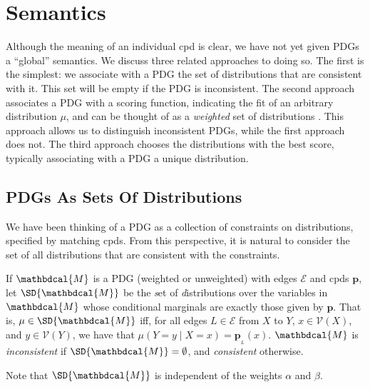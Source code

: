 \documentclass[letterpaper]{article} %
\theoremstyle{plain}
\theoremstyle{definition}
\theoremstyle{remark}
\newcommand\mat[1]{\mathbf{#1}}
\def\sheq{\!=\!}
\newcommand{\bp}[1][L]{\mat{p}_{\!_{#1}\!}}
\newcommand{\V}{\mathcal V}
\newcommand{\Ed}{\mathcal E}
\newcommand{\dg}[1]{\mathbdcal{#1}}
\newcommand{\notation}[1]{\ignorespaces} %
\begin{document}
\section{Semantics}\label{sec:semantics}
Although the meaning of an individual cpd is clear, we have not yet given 
PDGs a ``global'' semantics. We discuss three related approaches to doing so.
The first is the simplest: we associate with a PDG the set of distributions that
are consistent with it. This set will be empty if the PDG is inconsistent.
The second approach associates a PDG with a scoring function, indicating the fit
of an arbitrary distribution $\mu$, and can be thought of as a \emph{weighted}
set of distributions \cite{HL12}. This approach allows us to distinguish
inconsistent PDGs, while the first approach does not. The third approach chooses
the distributions with the best score, typically associating with a PDG a unique
distribution.

\subsection{PDGs As Sets Of Distributions}\label{sec:set-of-distribution-semantics} 
We have been thinking of a PDG as a collection of constraints on distributions,
specified by matching cpds. From this perspective, it is natural to consider the
set of all distributions that are consistent with the constraints.

\begin{defn} \label{def:set-semantics} 
If $\dg M$ is a PDG (weighted or unweighted) with edges $\Ed$ and
cpds $\mat p$, 
let $\SD{\dg M}$ be the \emph{s}et of
\emph{d}istributions over the variables in $\dg M$ 
whose conditional marginals are exactly those given by $\mat p$.
That is, $\mu \in \SD{\dg M}$ iff, for all edges $L \in \Ed$ from $X$
to $Y$,  $x \in 
\V(X)$,  and $y \in \V(Y)$, we have that $\mu(Y \!=\! y \mid X\sheq x) = \bp(x)$.
\notation{Formally,		
    \[ \SD[\Big]{\dg M} = \!\left\{\mu \!\in\! \Delta \V_\none (\dg M) \middle|\!
        \begin{array}{l}
        \mu(B\!\! =\!\! b \mid A\!\!=\!\! a) \geq \bp(b \mid a) \\[0.1em]
        ~\text{$\forall (A, B,\ell) \!\in\! \Ed$, $a \!\in\!\V(A)$, $b \!\in\! \V(B)$} 
   		\end{array}\!\!\! \right\}\]
    }
$\dg M$ is \emph{inconsistent} if $\SD{\dg M} = \emptyset$, and \emph{consistent} otherwise.
\end{defn}
Note that $\SD{\dg M}$ is independent of the weights $\alpha$ and $\beta$.
\end{document}
